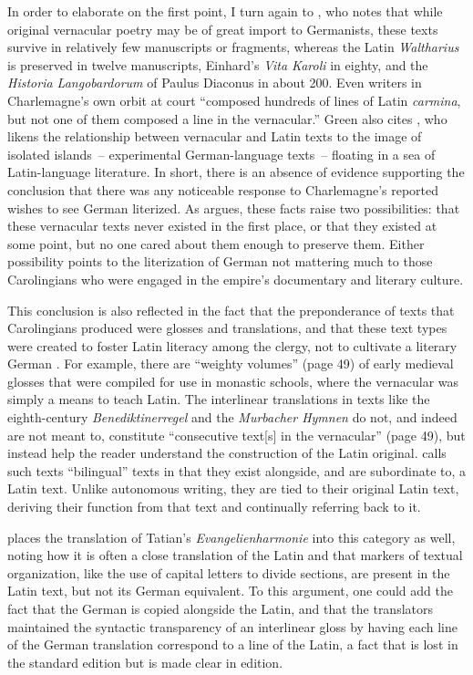 In order to elaborate on the first point, I turn again to \citet[49]{Green1994}, who notes that while original vernacular poetry may be of great import to Germanists, these texts survive in relatively few manuscripts or fragments, whereas the Latin \textit{Waltharius} is preserved in twelve manuscripts, Einhard’s \textit{Vita Karoli} in eighty, and the \textit{Historia Langobardorum} of Paulus Diaconus in about 200. Even writers in Charlemagne’s own orbit at court “composed hundreds of lines of Latin \textit{carmina}, but not one of them composed a line in the vernacular.” Green also cites \citet{Kuhn1959}, who likens the relationship between vernacular and Latin texts to the image of isolated islands~-- experimental German-language texts~-- floating in a sea of Latin-language literature. In short, there is an absence of evidence supporting the conclusion that there was any noticeable response to Charlemagne’s reported wishes to see German literized. As \citet[34, note 2]{Somers2021b} argues, these facts raise two possibilities: that these vernacular texts never existed in the first place, or that they existed at some point, but no one cared about them enough to preserve them. Either possibility points to the literization of German not mattering much to those Carolingians who were engaged in the empire’s documentary and literary culture.

This conclusion is also reflected in the fact that the preponderance of texts that Carolingians produced were glosses and translations, and that these text types were created to foster Latin literacy among the clergy, not to cultivate a literary German \citep[49--50]{Green1994}. For example, there are “weighty volumes” (page 49) of early medieval glosses that were compiled for use in monastic schools, where the vernacular was simply a means to teach Latin. The interlinear translations in texts like the eighth-century \textit{Benediktinerregel} and the \textit{Murbacher Hymnen} do not, and indeed are not meant to, constitute “consecutive text[s] in the vernacular” (page 49), but instead help the reader understand the construction of the Latin original. \citet[98]{Masser1989} calls such texts “bilingual” texts in that they exist alongside, and are subordinate to, a Latin text. Unlike autonomous writing, they are tied to their original Latin text, deriving their function from that text and continually referring back to it.

\citet[49--50]{Green1994} places the translation of Tatian’s \textit{Evangelienharmonie} into this category as well, noting how it is often a close translation of the Latin and that markers of textual organization, like the use of capital letters to divide sections, are present in the Latin text, but not its German equivalent. To this argument, one could add the fact that the German is copied alongside the Latin, and that the translators maintained the syntactic transparency of an interlinear gloss by having each line of the German translation correspond to a line of the Latin, a fact that is lost in the standard \citet{Sievers1961} edition but is made clear in  edition.

